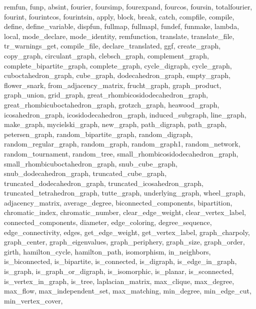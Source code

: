 {{    remfun,
    funp,
    absint,
    fourier,
    foursimp,
    fourexpand,
    fourcos,
    foursin,
    totalfourier,
    fourint,
    fourintcos,
    fourintsin,
    apply,
    block,
    break,
    catch,
    compfile,
    compile,
    define,
    define_variable,
    dispfun,
    fullmap,
    fullmapl,
    fundef,
    funmake,
    lambda,
    local,
    mode_declare,
    mode_identity,
    remfunction,
    translate,
    translate_file,
    tr_warnings_get,
    compile_file,
    declare_translated,
    ggf,
    create_graph,
    copy_graph,
    circulant_graph,
    clebsch_graph,
    complement_graph,
    complete_bipartite_graph,
    complete_graph,
    cycle_digraph,
    cycle_graph,
    cuboctahedron_graph,
    cube_graph,
    dodecahedron_graph,
    empty_graph,
    flower_snark,
    from_adjacency_matrix,
    frucht_graph,
    graph_product,
    graph_union,
    grid_graph,
    great_rhombicosidodecahedron_graph,
    great_rhombicuboctahedron_graph,
    grotzch_graph,
    heawood_graph,
    icosahedron_graph,
    icosidodecahedron_graph,
    induced_subgraph,
    line_graph,
    make_graph,
    mycielski_graph,
    new_graph,
    path_digraph,
    path_graph,
    petersen_graph,
    random_bipartite_graph,
    random_digraph,
    random_regular_graph,
    random_graph,
    random_graph1,
    random_network,
    random_tournament,
    random_tree,
    small_rhombicosidodecahedron_graph,
    small_rhombicuboctahedron_graph,
    snub_cube_graph,
    snub_dodecahedron_graph,
    truncated_cube_graph,
    truncated_dodecahedron_graph,
    truncated_icosahedron_graph,
    truncated_tetrahedron_graph,
    tutte_graph,
    underlying_graph,
    wheel_graph,
    adjacency_matrix,
    average_degree,
    biconnected_components,
    bipartition,
    chromatic_index,
    chromatic_number,
    clear_edge_weight,
    clear_vertex_label,
    connected_components,
    diameter,
    edge_coloring,
    degree_sequence,
    edge_connectivity,
    edges,
    get_edge_weight,
    get_vertex_label,
    graph_charpoly,
    graph_center,
    graph_eigenvalues,
    graph_periphery,
    graph_size,
    graph_order,
    girth,
    hamilton_cycle,
    hamilton_path,
    isomorphism,
    in_neighbors,
    is_biconnected,
    is_bipartite,
    is_connected,
    is_digraph,
    is_edge_in_graph,
    is_graph,
    is_graph_or_digraph,
    is_isomorphic,
    is_planar,
    is_sconnected,
    is_vertex_in_graph,
    is_tree,
    laplacian_matrix,
    max_clique,
    max_degree,
    max_flow,
    max_independent_set,
    max_matching,
    min_degree,
    min_edge_cut,
    min_vertex_cover,
}}
